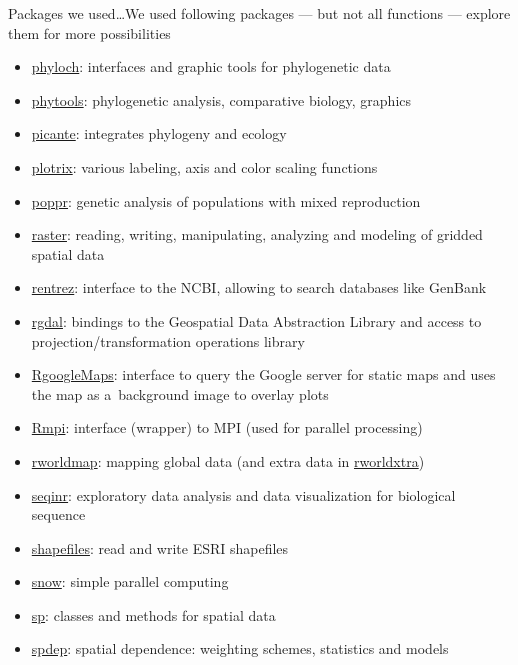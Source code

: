 \documentclass[compress, xelatex, 11pt, xcolor=svgnames, aspectratio=169,
	hyperref={
		bookmarks=true,
		unicode=true,
		colorlinks=true,
		pdftitle={Molecular data in R},
		plainpages=false,
		pdfauthor={Vojtech Zeisek},
		pdfsubject={Course about phylogeny and evolution in R},
		pdfcreator={XeLaTeX},
		pdfkeywords={R, evolution, phylogeny, molecular data},
		linkcolor=Crimson, %
		anchorcolor=Magenta, %
		citecolor=Magenta, %
		filecolor=Magenta, %
		menucolor=Magenta, %
		urlcolor=DodgerBlue, %
		},
	url={hyphens, lowtilde} %
	]{beamer}
\begin{document}
\begin{frame}[allowframebreaks]{Packages we used\ldots}{We used following packages --- but not all functions --- explore them for more possibilities}
\begin{itemize}
		\item \href{http://www.christophheibl.de/Rpackages.html}{phyloch}: interfaces and graphic tools for phylogenetic data
		\item \href{https://CRAN.R-project.org/package=phytools}{phytools}: phylogenetic analysis, comparative biology, graphics
		\item \href{https://CRAN.R-project.org/package=picante}{picante}: integrates phylogeny and ecology
		\item \href{https://CRAN.R-project.org/package=plotrix}{plotrix}: various labeling, axis and color scaling functions
		\item \href{https://CRAN.R-project.org/package=poppr}{poppr}: genetic analysis of populations with mixed reproduction
		\item \href{https://CRAN.R-project.org/package=raster}{raster}: reading, writing, manipulating, analyzing and modeling of gridded spatial data
		\item \href{https://CRAN.R-project.org/package=rentrez}{rentrez}: interface to the NCBI, allowing to search databases like GenBank
		\item \href{https://CRAN.R-project.org/package=rgdal}{rgdal}: bindings to the Geospatial Data Abstraction Library and access to projection/transformation operations library %
		\item \href{https://CRAN.R-project.org/package=RgoogleMaps}{RgoogleMaps}: interface to query the Google server for static maps and uses the map as a~background image to overlay plots
		\item \href{https://CRAN.R-project.org/package=Rmpi}{Rmpi}: interface (wrapper) to MPI (used for parallel processing)
		\item \href{https://CRAN.R-project.org/package=rworldmap}{rworldmap}: mapping global data (and extra data in \href{https://CRAN.R-project.org/package=rworldxtra}{rworldxtra})
		\item \href{https://CRAN.R-project.org/package=seqinr}{seqinr}: exploratory data analysis and data visualization for biological sequence
		\item \href{https://CRAN.R-project.org/package=shapefiles}{shapefiles}: read and write ESRI shapefiles
		\item \href{https://CRAN.R-project.org/package=snow}{snow}: simple parallel computing
		\item \href{https://CRAN.R-project.org/package=sp}{sp}: classes and methods for spatial data
		\item \href{https://CRAN.R-project.org/package=spdep}{spdep}: spatial dependence: weighting schemes, statistics and models

\end{itemize}
\end{frame}
\end{document}
